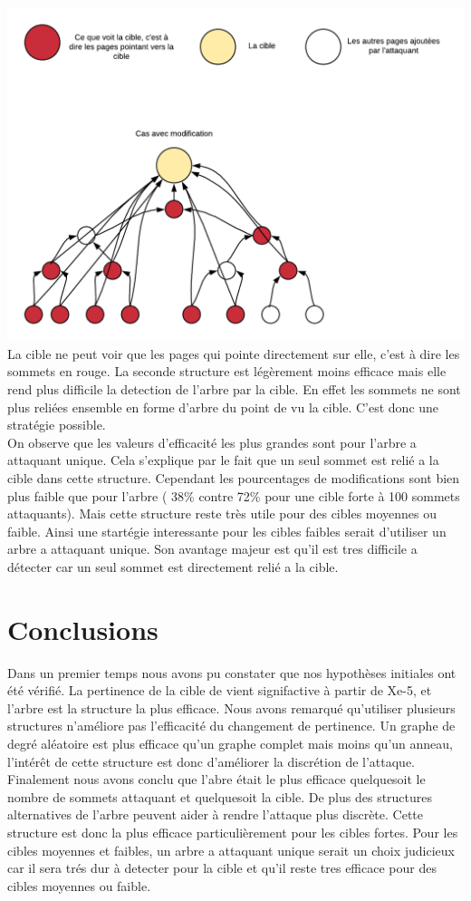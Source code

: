 \documentclass[a4paper,11pt]{article}
\begin{document}
		\includegraphics[scale = 0.5]{Captures/diagramme2.png}\\
		La cible ne peut voir que les pages qui pointe directement sur elle, c'est à dire les sommets en rouge.
		La seconde structure est légèrement moins efficace mais elle rend plus difficile la detection de l'arbre par la cible. En effet les sommets ne sont plus reliées ensemble en forme d'arbre du point de vu la cible.
		C'est donc une stratégie possible.\\
		
		On observe que les valeurs d'efficacité les plus grandes sont pour l'arbre a attaquant unique. Cela s'explique par le fait que un seul sommet est relié a la cible dans cette structure.
		Cependant les pourcentages de modifications sont bien plus faible que pour l'arbre ( 38\% contre 72\% pour une cible forte à 100 sommets attaquants).
		Mais cette structure reste très utile pour des cibles moyennes ou faible. Ainsi une startégie interessante pour les cibles faibles serait d'utiliser un arbre a attaquant unique.
		Son avantage majeur est qu'il est tres difficile a détecter car un seul sommet est directement relié a la cible.\\
	
\section{Conclusions}
	Dans un premier temps nous avons pu constater que nos hypothèses initiales ont été vérifié. La pertinence de la cible de vient signifactive à partir de Xe-5, et l'arbre est la structure la plus efficace. Nous avons remarqué qu'utiliser plusieurs structures n'améliore pas l'efficacité du changement de pertinence. Un graphe de degré aléatoire est plus efficace qu'un graphe complet mais moins qu'un anneau, l'intérêt de cette structure est donc d'améliorer la discrétion de l'attaque. Finalement nous avons conclu que l'abre était le plus efficace quelquesoit le nombre de sommets attaquant et quelquesoit la cible. De plus des structures alternatives de l'arbre peuvent aider à rendre l'attaque plus discrète. Cette structure est donc la plus efficace particulièrement pour les cibles fortes. Pour les cibles moyennes et faibles, un arbre a attaquant unique serait un choix judicieux car il sera trés dur à detecter pour la cible et qu'il reste tres efficace pour des cibles moyennes ou faible.
\end{document}
